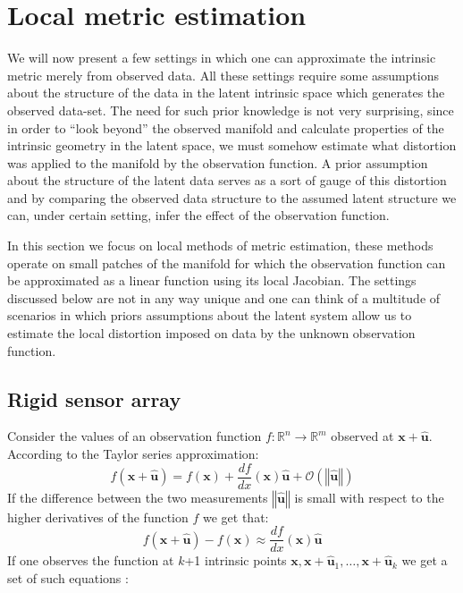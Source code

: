 


\section{Local metric estimation}
\label{sec:Local-intrinsic-metric}

We will now present a few settings in which one can approximate the intrinsic metric merely from observed data. All these settings require some assumptions about the structure of the data in the latent intrinsic space which generates the observed data-set. The need for such prior knowledge is not very surprising, since in order to ``look beyond'' the observed manifold and calculate properties of the intrinsic geometry in the latent space, we must somehow estimate what distortion was applied to the manifold by the observation function. A prior assumption about the structure of the latent data serves as a sort of gauge of this distortion and by comparing the observed data structure to the
assumed latent structure we can, under certain setting, infer the effect of the observation function.

In this section we focus on local methods of metric estimation, these methods operate on small patches of the manifold for which the observation function can be approximated as a linear function using its local Jacobian. The settings discussed below are not in any way unique and one can think of a multitude of scenarios in which priors assumptions about the latent system allow us to estimate the local distortion imposed on data by the unknown observation function.

\subsection{Rigid sensor array}
\label{ssec:Rigid-sensor-array}

Consider the values of an observation function $f:\mathbb{R}^{n}\to\mathbb{R}^{m}$ observed at $\mathbf{x}+\hat{\mathbf{u}}$. According to the Taylor series approximation:
\[
f\left(\mathbf{x}+\hat{\mathbf{u}}\right)=f\left(\mathbf{x}\right)+\frac{df}{dx}\left(\mathbf{x}\right)\hat{\mathbf{u}}+\mathcal{O}\left(\left\Vert \hat{\mathbf{u}}\right\Vert \right)
\]
If the difference between the two measurements $\left\Vert \hat{\mathbf{u}}\right\Vert $ is small with respect to the higher derivatives of the function $f$ we get that:
\[
f\left(\mathbf{x}+\hat{\mathbf{u}}\right)-f\left(\mathbf{x}\right)\approx\frac{df}{dx}\left(\mathbf{x}\right)\hat{\mathbf{u}}
\]
If one observes the function at $k$+1 intrinsic points $\mathbf{x},\mathbf{x}+\hat{\mathbf{u}}_{1},\ldots,\mathbf{x}+\hat{\mathbf{u}}_{k}$
we get a set of such equations :

